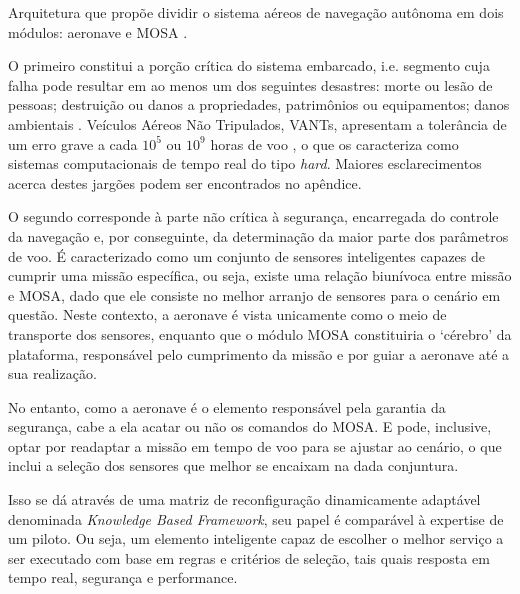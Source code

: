 Arquitetura que propõe dividir o sistema aéreos de navegação autônoma em dois módulos: aeronave e MOSA \cite{mosa_proposal}.

O primeiro constitui a porção crítica do sistema embarcado, i.e. segmento cuja falha pode resultar em ao menos um dos seguintes desastres: morte 
ou lesão de pessoas; destruição ou danos a propriedades, patrimônios ou equipamentos; danos ambientais \cite{safety}.
Veículos Aéreos Não Tripulados, VANTs, apresentam a tolerância de um erro grave a cada $10^5$ ou $10^9$ horas de voo \cite{hard}, o que os 
caracteriza
como sistemas computacionais de tempo real do tipo \textit{hard}. 
Maiores esclarecimentos acerca destes jargões podem ser encontrados no apêndice.

O segundo corresponde à parte não crítica à segurança, encarregada do controle da navegação e, por conseguinte, da determinação da maior parte dos 
parâmetros de voo. É caracterizado como um conjunto de sensores inteligentes capazes de cumprir uma missão específica, ou seja, 
existe uma relação biunívoca entre missão e MOSA, dado que ele consiste no melhor arranjo de sensores para o cenário em questão. Neste contexto, a 
aeronave é vista unicamente como o meio de transporte dos sensores, enquanto que o módulo MOSA constituiria o \textquoteleft cérebro\textquoteright{}  
da plataforma, responsável pelo cumprimento da missão e por guiar a aeronave até a sua realização.


No entanto, como a aeronave é o elemento responsável pela garantia da segurança, cabe a ela acatar ou não os comandos do MOSA. E pode, inclusive, 
optar por readaptar a missão em tempo de voo para se ajustar ao cenário, o que inclui a seleção dos sensores que melhor se encaixam na dada 
conjuntura.

Isso se dá através de uma matriz de reconfiguração dinamicamente adaptável denominada \textit{Knowledge Based Framework}, seu papel é comparável à 
expertise de um piloto.
Ou seja, um elemento inteligente capaz de escolher o melhor serviço  a ser executado com base em regras e critérios de seleção, tais quais resposta 
em tempo 
real, segurança e performance.


